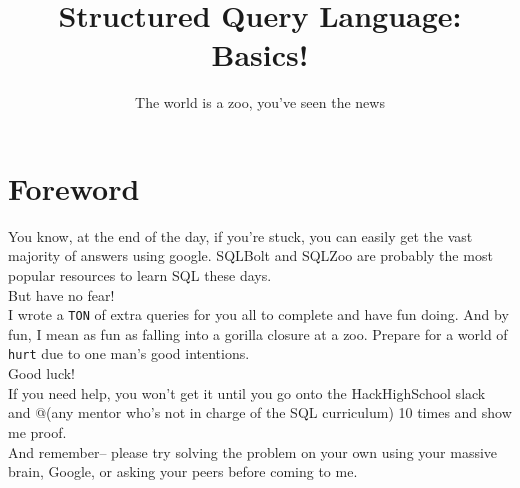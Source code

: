 \documentclass{42-en}
\begin{document}
                           \title{Structured Query Language: Basics!}
                          \subtitle{The world is a zoo, you've seen the news}


\maketitle

\tableofcontents


\chapter{Foreword}

	You know, at the end of the day, if you're stuck, you can easily get the 
	vast majority of answers using google. SQLBolt and SQLZoo are probably 
	the most popular resources to learn SQL these days. \\
	
	But have no fear! \\ 

	I wrote a \texttt{TON} of extra queries for you all to complete and have fun 
	doing. And by fun, I mean as fun as falling into a gorilla closure at a 
	zoo. Prepare for a world of \texttt{hurt} due to one man's good intentions. \\

	Good luck! \\

	If you need help, you won't get it until you go onto the HackHighSchool slack 
	and @(any mentor who's not in charge of the SQL curriculum) 10 times and show me proof. \\

	And remember-- please try solving the problem on your own using your massive brain, 
	Google, or asking your peers before coming to me. \\ 
\end{document}
